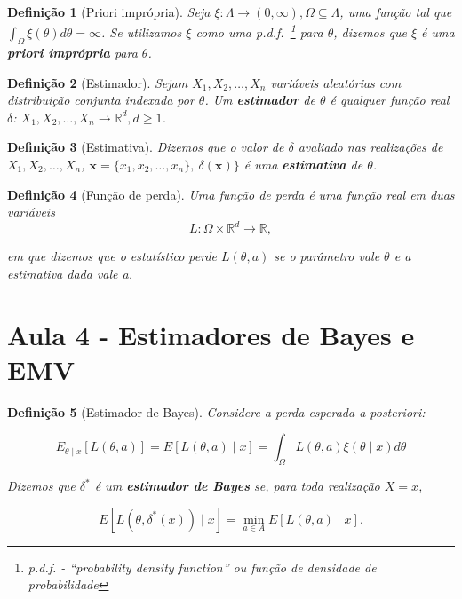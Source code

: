 \documentclass{article}
\newtheorem{definition}{Definição}
\begin{document}
\begin{definition}[Priori imprópria]
Seja $\xi : \Lambda \rightarrow (0, \infty), \Omega \subseteq \Lambda$, uma função tal que $\int_\Omega \xi(\theta) d \theta = \infty$. Se utilizamos $\xi$ como uma p.d.f.~\footnote{p.d.f. - ``probability density function'' ou função de densidade de probabilidade} para $\theta$, dizemos que $\xi$ é uma \textbf{priori imprópria} para $\theta$.
\end{definition}

\begin{definition}[Estimador]
Sejam $X_1, X_2, \ldots, X_n$ variáveis aleatórias com distribuição conjunta indexada por $\theta$. Um \textbf{estimador} de $\theta$ é qualquer função real $\delta$: $X_1, X_2, \ldots, X_n \rightarrow \mathbb{R}^d, d \geq 1$.
\end{definition}

\begin{definition}[Estimativa]
Dizemos que o valor de $\delta$ avaliado nas realizações de $X_1, X_2, \ldots, X_n$, $\textbf{x} = \{x_1, x_2, \ldots, x_n\}, \ \delta(\textbf{x})\}$ é uma \textbf{estimativa} de $\theta$.
\end{definition}

\begin{definition}[Função de perda]
Uma função de perda é uma função real em duas variáveis 
\begin{equation}
L: \Omega \times \mathbb{R}^d \rightarrow \mathbb{R},
\end{equation}

em que dizemos que o estatístico \textit{perde} $L(\theta, a)$ se o parâmetro vale $\theta$ e a estimativa dada vale a.
\end{definition}

\section*{Aula 4 - Estimadores de Bayes e EMV}

\begin{definition}[Estimador de Bayes]
Considere a perda esperada a posteriori:

\begin{equation}
E_{\theta \mid x} [L(\theta, a)] = E[L(\theta, a) \mid x] = \int_\Omega L(\theta, a) \xi (\theta \mid x) d \theta
\end{equation}

Dizemos que $\delta^*$ é um \textbf{estimador de Bayes} se, para toda realização $X = x$,

\begin{equation}
E[L(\theta, \delta^*(x)) \mid x] = \min_{a \in A} E[L(\theta, a) \mid x].
\end{equation}
\end{definition}
\end{document}
